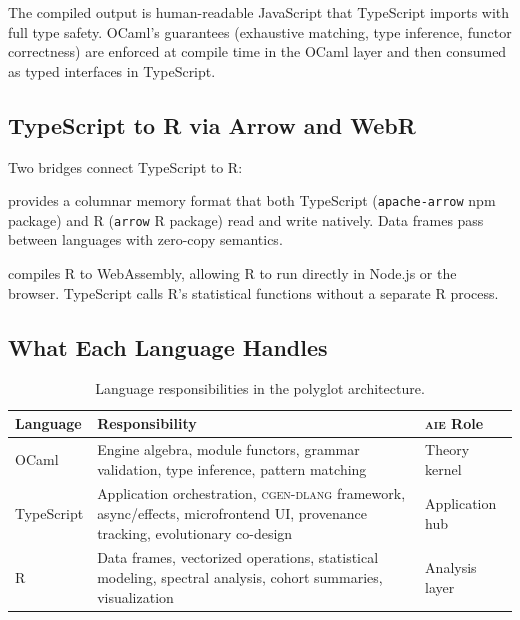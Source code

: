 \documentclass[11pt,letterpaper]{article}
\newcommand{\aie}{\textsc{aie}}
\newcommand{\cgen}{\textsc{cgen-dlang}}
\begin{document}
The compiled output is human-readable JavaScript that TypeScript imports with full type safety. OCaml's guarantees (exhaustive matching, type inference, functor correctness) are enforced at compile time in the OCaml layer and then consumed as typed interfaces in TypeScript.

\subsection{TypeScript to R via Arrow and WebR}

Two bridges connect TypeScript to R:

\begin{description}[leftmargin=*,style=nextline]
  \item[Apache Arrow] provides a columnar memory format that both TypeScript (\texttt{apache-arrow} npm package) and R (\texttt{arrow} R package) read and write natively. Data frames pass between languages with zero-copy semantics.
  \item[WebR] compiles R to WebAssembly, allowing R to run directly in Node.js or the browser. TypeScript calls R's statistical functions without a separate R process.
\end{description}

\subsection{What Each Language Handles}

\begin{table}[H]
\centering
\begin{tabularx}{\textwidth}{lXl}
\toprule
\textbf{Language} & \textbf{Responsibility} & \textbf{\aie{} Role} \\
\midrule
OCaml & Engine algebra, module functors, grammar validation, type inference, pattern matching & Theory kernel \\
\addlinespace
TypeScript & Application orchestration, \cgen{} framework, async/effects, microfrontend UI, provenance tracking, evolutionary co-design & Application hub \\
\addlinespace
R & Data frames, vectorized operations, statistical modeling, spectral analysis, cohort summaries, visualization & Analysis layer \\
\bottomrule
\end{tabularx}
\caption{Language responsibilities in the polyglot architecture.}
\label{tab:language-roles}
\end{table}
\end{document}
